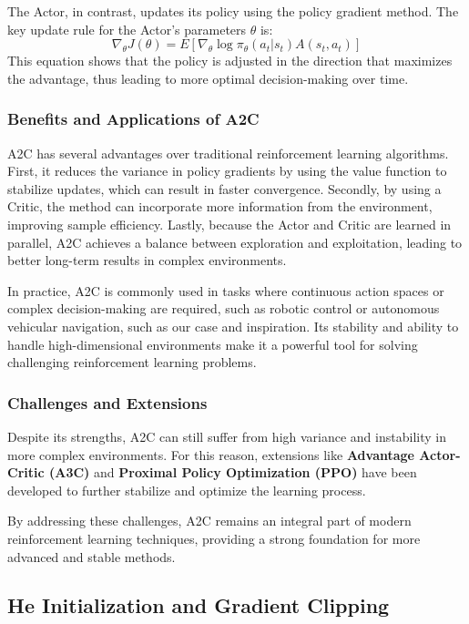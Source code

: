 The Actor, in contrast, updates its policy using the policy gradient method. The key update rule for the Actor’s parameters $\theta$ is:
\[\nabla_\theta J(\theta) = E [\nabla_\theta \log \pi_\theta (a_t | s_t)A(s_t , a_t)]\]
This equation shows that the policy is adjusted in the direction that maximizes the advantage, thus leading to more optimal decision-making over time.

\subsubsection*{Benefits and Applications of A2C}

A2C has several advantages over traditional reinforcement learning algorithms. First, it reduces the variance in policy gradients by using the value function to stabilize updates, which can result in faster convergence. Secondly, by using a Critic, the method can incorporate more information from the environment, improving sample efficiency. Lastly, because the Actor and Critic are learned in parallel, A2C achieves a balance between exploration and exploitation, leading to better long-term results in complex environments.

In practice, A2C is commonly used in tasks where continuous action spaces or complex decision-making are required, such as robotic control or autonomous vehicular navigation, such as our case and inspiration. Its stability and ability to handle high-dimensional environments make it a powerful tool for solving challenging reinforcement learning problems.

\subsubsection*{Challenges and Extensions}

Despite its strengths, A2C can still suffer from high variance and instability in more complex environments. For this reason, extensions like \textbf{Advantage Actor-Critic (A3C)} and \textbf{Proximal Policy Optimization (PPO)} have been developed to further stabilize and optimize the learning process.

By addressing these challenges, A2C remains an integral part of modern reinforcement learning techniques, providing a strong foundation for more advanced and stable methods.

\subsection*{He Initialization and Gradient Clipping}

